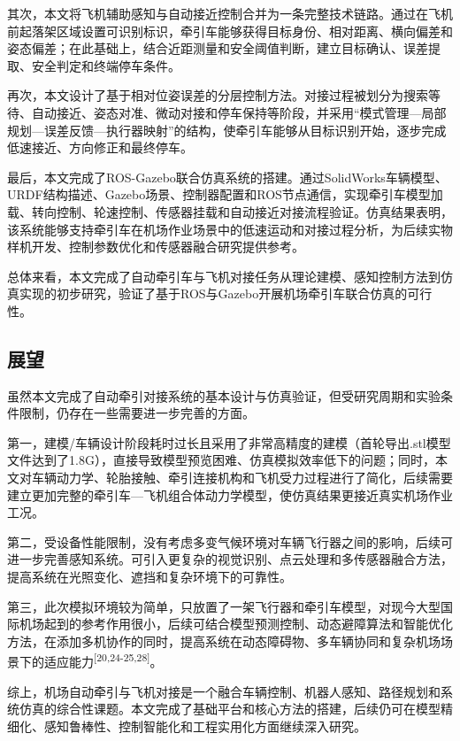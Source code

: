 \documentclass[UTF8,a4paper,12pt]{ctexart}
\begin{document}
其次，本文将飞机辅助感知与自动接近控制合并为一条完整技术链路。通过在飞机前起落架区域设置可识别标识，牵引车能够获得目标身份、相对距离、横向偏差和姿态偏差；在此基础上，结合近距测量和安全阈值判断，建立目标确认、误差提取、安全判定和终端停车条件。

再次，本文设计了基于相对位姿误差的分层控制方法。对接过程被划分为搜索等待、自动接近、姿态对准、微动对接和停车保持等阶段，并采用``模式管理---局部规划---误差反馈---执行器映射''的结构，使牵引车能够从目标识别开始，逐步完成低速接近、方向修正和最终停车。

最后，本文完成了ROS-Gazebo联合仿真系统的搭建。通过SolidWorks车辆模型、URDF结构描述、Gazebo场景、控制器配置和ROS节点通信，实现牵引车模型加载、转向控制、轮速控制、传感器挂载和自动接近对接流程验证。仿真结果表明，该系统能够支持牵引车在机场作业场景中的低速运动和对接过程分析，为后续实物样机开发、控制参数优化和传感器融合研究提供参考。

总体来看，本文完成了自动牵引车与飞机对接任务从理论建模、感知控制方法到仿真实现的初步研究，验证了基于ROS与Gazebo开展机场牵引车联合仿真的可行性。

\subsection{展望}\label{_Toc228997228}

虽然本文完成了自动牵引对接系统的基本设计与仿真验证，但受研究周期和实验条件限制，仍存在一些需要进一步完善的方面。

第一，建模/车辆设计阶段耗时过长且采用了非常高精度的建模（首轮导出.stl模型文件达到了1.8G），直接导致模型预览困难、仿真模拟效率低下的问题；同时，本文对车辆动力学、轮胎接触、牵引连接机构和飞机受力过程进行了简化，后续需要建立更加完整的牵引车---飞机组合体动力学模型，使仿真结果更接近真实机场作业工况。

第二，受设备性能限制，没有考虑多变气候环境对车辆飞行器之间的影响，后续可进一步完善感知系统。可引入更复杂的视觉识别、点云处理和多传感器融合方法，提高系统在光照变化、遮挡和复杂环境下的可靠性。

第三，此次模拟环境较为简单，只放置了一架飞行器和牵引车模型，对现今大型国际机场起到的参考作用很小，后续可结合模型预测控制、动态避障算法和智能优化方法，在添加多机协作的同时，提高系统在动态障碍物、多车辆协同和复杂机场场景下的适应能力\textsuperscript{[20,24-25,28]}。

综上，机场自动牵引与飞机对接是一个融合车辆控制、机器人感知、路径规划和系统仿真的综合性课题。本文完成了基础平台和核心方法的搭建，后续仍可在模型精细化、感知鲁棒性、控制智能化和工程实用化方面继续深入研究。
\end{document}

